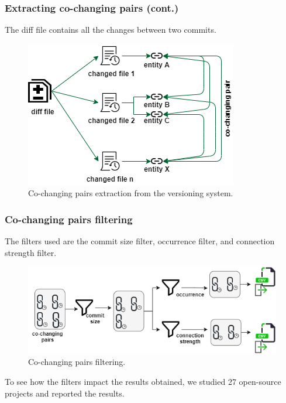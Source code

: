 \documentclass{beamer}
\begin{document}
 \begin{frame}
\frametitle{Extracting co-changing pairs (cont.)}
The diff file contains all the changes between two commits.
\begin{center}
     \begin{figure}
	\includegraphics[scale=0.65]{cochange_extract.png}
	\caption{\label{fig:fig1}Co-changing pairs extraction from the versioning system.}
     \end{figure}
\end{center}
\end{frame}

 \begin{frame}
\frametitle{Co-changing pairs filtering}
The filters used are the commit size filter, occurrence filter, and connection strength filter. 
\begin{center}
     \begin{figure}
	\includegraphics[width=\textwidth]{co-change_filtering.png}
	\caption{\label{fig:fig1}Co-changing pairs filtering.}
     \end{figure}
\end{center}
To see how the filters impact the results obtained, we studied 27 open-source projects and reported the results.
\end{frame}

\end{document}
